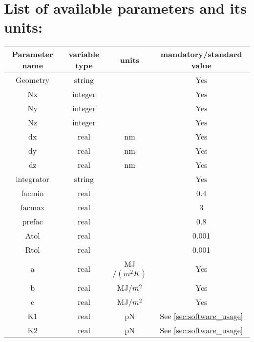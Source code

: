 \documentclass[final,5p,times,twocolumn]{elsarticle}
\begin{document}
 \appendix

\section{List of available parameters and its units:}
 \label{apx:input_file}

 \onecolumn
 \begin{center}
	\begin{longtable}{|c|c|c|c|}
          \hline 
          Parameter name  & variable type	& units & mandatory/standard value\\ 
          \hline 
          {Geometry}	& string & 	& Yes  \\ 
          \hline 
          {Nx}	& integer &	& Yes \\ 
          \hline                                  
          {Ny}	& integer &      & Yes \\ 
          \hline                                  
          {Nz}	& integer &      & Yes \\ 
          \hline                                  
          {dx}	& real & nm      & Yes \\ 
          \hline                                  
          {dy}	& real & nm   & Yes \\ 
          \hline                                  
          {dz}	& real & nm	& Yes \\ 
          \hline 
          {integrator}	& string & & Yes\\ 
          \hline 
          facmin	& real &   & 0.4\\ 
          \hline 
          facmax	& real &   & 3\\ 
          \hline 
          prefac	& real &  & 0.8\\ 
          \hline 
          Atol	& real &  &0.001\\ 
          \hline 
          Rtol & real &  &0.001\\ 
          \hline 
          {a} & real& MJ$/(m^2 K)$ & Yes\\
          \hline 
          {b} & real& MJ$/m^2$ & Yes\\ 
          \hline
          {c} & real& MJ$/m^2$ & Yes\\ 
          \hline 
          {K1} & real &  pN  &  See \ref{sec:software_usage}\\ 
          \hline
          {K2} & real &  pN  &  See \ref{sec:software_usage}\\ 

\end{longtable}
\end{center}
\end{document}
